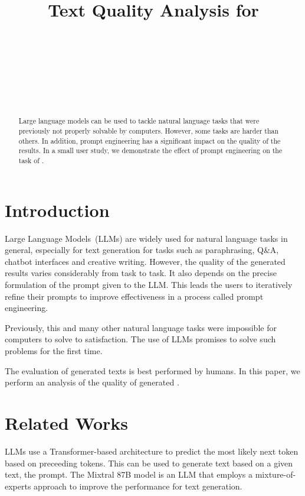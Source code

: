 \documentclass[11pt]{article}
\title{Text Quality Analysis for \todo{LLM-Generated Humor}}
\author{\todo{First Author}\\
  \todo{School (optional)} \\
  \todo{E-Mail (optional)} \\\And
  \todo{Second Author} \\
  \todo{School (optional)} \\
  \todo{E-Mail (optional)} \\
}
\begin{document}
\maketitle
\begin{abstract}
  Large language models can be used to tackle natural language tasks that were previously not properly solvable by computers.
  However, some tasks are harder than others. In addition, prompt engineering has a significant impact on the quality of the results.
  In a small user study, we demonstrate the effect of prompt engineering on the task of .
\end{abstract}

\section{Introduction}

Large Language Models~(LLMs) are widely used for natural language tasks in general, especially for text generation for tasks such as paraphrasing, Q\&A, chatbot interfaces and creative writing. However, the quality of the generated results varies considerably from task to task. It also depends on the precise formulation of the prompt given to the LLM. This leads the users to iteratively refine their prompts to improve effectiveness in a process called prompt engineering.

 Previously, this and many other natural language tasks were impossible for computers to solve to satisfaction. The use of LLMs promises to solve such problems for the first time.

The evaluation of generated texts is best performed by humans. In this paper, we perform an analysis of the quality of generated .


\section{Related Works}
LLMs use a Transformer-based architecture \cite{vaswani2017} to predict the most likely next token based on preceeding tokens. This can be used to generate text based on a given text, the prompt.
The Mixtral 8\texttimes 7B model \cite{jiang2024} is an LLM that employs a mixture-of-experts approach to improve the performance for text generation.
\end{document}
